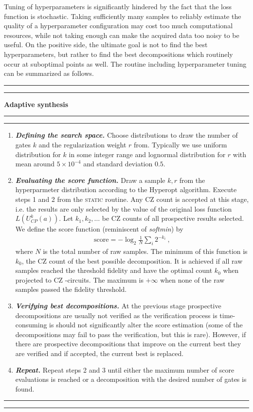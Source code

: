 \documentclass[twocolumn, amsfonts, amssymb, aps, nofootinbib]{revtex4-2}
\newcommand{\CZ}{\textsf{CZ }}
\newcommand{\static}{\textsc{static }}
\begin{document}
Tuning of hyperparameters is significantly hindered by the fact that the loss function is stochastic. Taking sufficiently many samples to reliably estimate the quality of a hyperparameter configuration may cost too much computational resources, while not taking enough can make the acquired data too noisy to be useful. On the positive side, the ultimate goal is not to find the best hyperparameters, but rather to find the best decompositions which routinely occur at suboptimal points as well. The routine including hyperparameter tuning can be summarized as follows.
\\[6pt]
\hrule
\hrule
\vspace{6pt}
{\large\textbf{\qquad Adaptive synthesis}}
\vspace{6pt}
\hrule
\hrule
\begin{enumerate}
\item \textit{\textbf{Defining the search space.}} Choose distributions to draw the number of gates $k$ and the regularization weight $r$ from. Typically we use uniform distribution for $k$ in some integer range and lognormal distribution for $r$ with mean around $5\times 10^{-4}$ and standard deviation $0.5$.
\item \textit{\textbf{Evaluating the score function.}} Draw a sample $k, r$ from the hyperparmeter distribution according to the Hyperopt algorithm. Execute steps 1 and 2 from the \static routine. Any \CZ count is accepted at this stage, i.e. the results are only selected by the value of the original loss function $L(U_{CP}^k(a))$. Let $k_1, k_2,\dots$ be \CZ counts of all prospective results selected. We define the score function (reminiscent of \textit{softmin}) by
\begin{align}
\text{score}=-\log_2\frac{1}{N}\sum_{i}2^{-k_i} \label{score} \ ,
\end{align}
where $N$ is the total number of raw samples. The minimum of this function is $k_0$, the \CZ count of the best possible decomposition. It is achieved if all raw samples reached the threshold fidelity and have the optimal count $k_0$ when projected to \CZ-circuits. The maximum is $+\infty$ when none of the raw samples passed the fidelity threshold.
\item \textit{\textbf{Verifying best decompositions.}} At the previous stage prospective decompositions are usually not verified as the verification process is time-consuming is should not significantly alter the score estimation (some of the decompositions may fail to pass the verification, but this is rare). However, if there are prospective decompositions that improve on the current best they are verified and if accepted, the current best is replaced.

\item \textit{\textbf{Repeat.}} Repeat steps 2 and 3 until either the maximum number of score evaluations is reached or a decomposition with the desired number of gates is found.
\end{enumerate}
\hrule
\hrule
\vspace{6pt}
\end{document}
